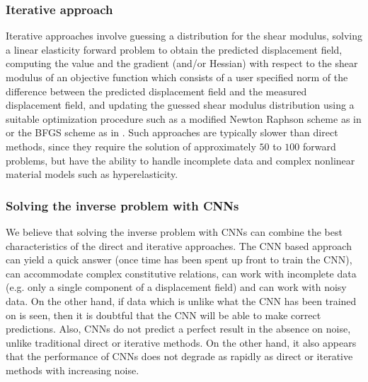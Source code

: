 \documentclass[12pt]{article}
\begin{document}
\subsubsection{Iterative approach} Iterative approaches \cite{paper:oberai2003,paper:gokhale2008,paper:kalle1996,paper:doyley,paper:goenezen2011} involve guessing a distribution for the shear modulus, solving a linear elasticity forward problem to obtain the predicted displacement field, computing the value and the gradient (and/or Hessian) with respect to the shear modulus of an objective function which consists of a user specified norm of the difference between the predicted displacement field and the measured displacement field, and updating the guessed shear modulus distribution using a suitable optimization procedure such as a modified Newton Raphson scheme as in \cite{paper:doyley} or the BFGS scheme as in \cite{paper:gokhale2008,paper:goenezen2011}. Such approaches are typically slower than direct methods, since they require the solution of approximately $50$ to $100$ forward problems, but have the ability to handle incomplete data and complex nonlinear material models such as hyperelasticity.
\subsubsection{Solving the inverse problem with CNNs}
We believe that solving the inverse problem with CNNs can combine the best characteristics of the direct and iterative approaches. The CNN based approach can yield a quick answer (once time has been spent up front to train the CNN), can accommodate complex constitutive relations, can work with incomplete data (e.g. only a single component of a displacement field) and can work with noisy data. On the other hand, if data which is unlike what the CNN has been trained on is seen, then it is doubtful that the CNN will be able to make correct predictions. Also, CNNs do not predict a perfect result in the absence on noise, unlike traditional direct or iterative methods. On the other hand, it also appears that the performance of CNNs does not degrade as rapidly as direct or iterative methods with increasing noise.
\end{document}
